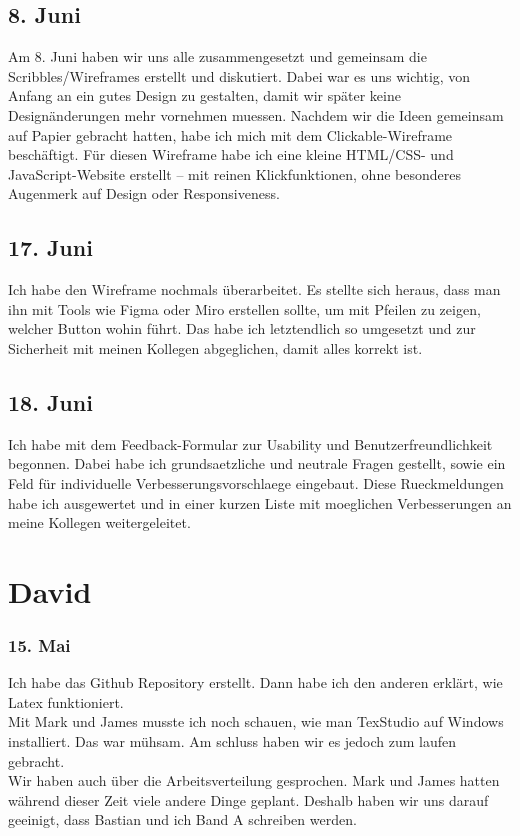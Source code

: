 \documentclass[10pt]{article}
\begin{document}
	\subsection{8. Juni}
	Am 8. Juni haben wir uns alle zusammengesetzt und gemeinsam die Scribbles/Wireframes erstellt und diskutiert. Dabei war es uns wichtig, von Anfang an ein gutes Design zu gestalten, damit wir später keine Designänderungen mehr vornehmen muessen. Nachdem wir die Ideen gemeinsam auf Papier gebracht hatten, habe ich mich mit dem Clickable-Wireframe beschäftigt. Für diesen Wireframe habe ich eine kleine HTML/CSS- und JavaScript-Website erstellt – mit reinen Klickfunktionen, ohne besonderes Augenmerk auf Design oder Responsiveness.
	\subsection{17. Juni}
	Ich habe den Wireframe nochmals überarbeitet. Es stellte sich heraus, dass man ihn mit Tools wie Figma oder Miro erstellen sollte, um mit Pfeilen zu zeigen, welcher Button wohin führt. Das habe ich letztendlich so umgesetzt und zur Sicherheit mit meinen Kollegen abgeglichen, damit alles korrekt ist.
	\subsection{18. Juni}
	Ich habe mit dem Feedback-Formular zur Usability und Benutzerfreundlichkeit begonnen. Dabei habe ich grundsaetzliche und neutrale Fragen gestellt, sowie ein Feld für individuelle Verbesserungsvorschlaege eingebaut. Diese Rueckmeldungen habe ich ausgewertet und in einer kurzen Liste mit moeglichen Verbesserungen an meine Kollegen weitergeleitet.
	\section{David}
	\subsubsection{15. Mai}
	Ich habe das Github Repository erstellt. Dann habe ich den anderen erklärt, wie Latex funktioniert.\\
	Mit Mark und James musste ich noch schauen, wie man TexStudio auf Windows installiert. Das war mühsam. Am schluss haben wir es jedoch zum laufen gebracht.\\
	Wir haben auch über die Arbeitsverteilung gesprochen. Mark und James hatten während dieser Zeit viele andere Dinge geplant. Deshalb haben wir uns darauf geeinigt, dass Bastian und ich Band A schreiben werden.\\
\end{document}
